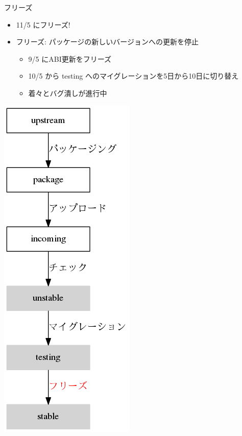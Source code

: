 \begin{frame}{フリーズ}
\begin{minipage}{0.55\hsize}
\begin{itemize}
\item 11/5 にフリーズ!
\item フリーズ: パッケージの新しいバージョンへの更新を停止
\begin{itemize}
\item 9/5 にABI更新をフリーズ
\item 10/5 から testing へのマイグレーションを5日から10日に切り替え
\item 着々とバグ潰しが進行中
\end{itemize}
\end{itemize}
\end{minipage}
\begin{minipage}{0.39\hsize}
\begin{center}
\includegraphics[scale=0.3]{image201410/lifesycle-package.png}
\end{center}
\end{minipage}
\end{frame}

